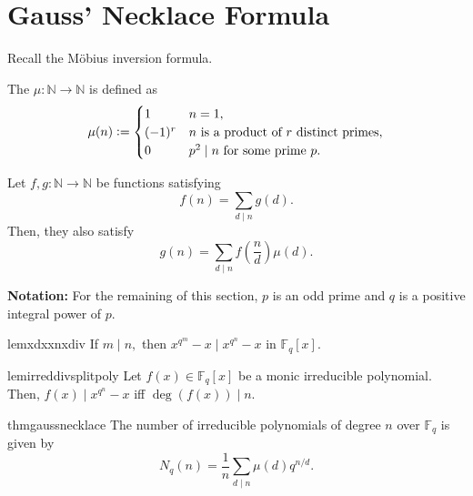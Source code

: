 \section{Gauss' Necklace Formula}

Recall the M\"obius inversion formula.

\begin{defn}%
    The  $\mu : \mathbb{N} \to \mathbb{N}$ is defined as
    \begin{equation*} 
        \mu(n) \vcentcolon= \begin{cases}
            1 & n = 1,\\
            (-1)^r & n \text{ is a product of }r \text{ distinct primes},\\
            0 & p^2 \mid n \text{ for some prime }p.
        \end{cases}
    \end{equation*}
\end{defn}

\begin{thm} \label{thm:mobiusinv}
    Let $f, g : \mathbb{N} \to \mathbb{N}$ be functions satisfying
    \begin{equation*} 
        f(n) = \sum_{d \mid n} g(d).
    \end{equation*}
    Then, they also satisfy
    \begin{equation*} 
        g(n) = \sum_{d \mid n} f\left(\frac{n}{d}\right)\mu(d).
    \end{equation*}
\end{thm}

\textbf{Notation:} For the remaining of this section, $p$ is an odd prime and $q$ is a positive integral power of $p.$

\begin{restatable}[]{lem}{xdxxnxdiv}
\label{lem:xdxxnxdiv}
    If $m \mid n,$ then $x^{q^m} - x \mid x^{q^n} - x$ in $\mathbb{F}_q[x].$ \hfill\hyperref[lem:xdxxnxdiv2]{\downsym}
\end{restatable}

\begin{restatable}[]{lem}{irreddivsplitpoly}
\label{lem:irreddivsplitpoly}
    Let $f(x) \in \mathbb{F}_q[x]$ be a monic irreducible polynomial. \\
    Then, $f(x) \mid x^{q^n} - x$ iff $\deg(f(x)) \mid n.$ \hfill\hyperref[lem:irreddivsplitpoly2]{\downsym}
\end{restatable}

\begin{restatable}[Gauss]{thm}{gaussnecklace}
\label{thm:gaussnecklace}
    The number of irreducible polynomials of degree $n$ over $\mathbb{F}_{q}$ is given by
    \begin{equation*} 
        N_q(n) = \frac{1}{n}\sum_{d \mid n} \mu(d)q^{n/d}.
    \end{equation*} \hfill\hyperref[thm:gaussnecklace2]{\downsym}
\end{restatable}


